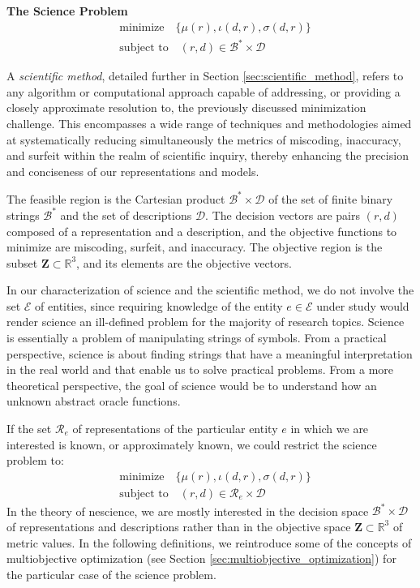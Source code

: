 \begin{tBox}
\textbf{The Science Problem}
\begin{align*}
 & \text{minimize} \quad \{ \mu(r), \iota(d, r), \sigma(d, r)\} \\
 & \text{subject to} \quad (r, d) \in \mathcal{B}^\ast \times \mathcal{D}
\end{align*}
\end{tBox}

A \emph{scientific method}, detailed further in Section \ref{sec:scientific_method}, refers to any algorithm or computational approach capable of addressing, or providing a closely approximate resolution to, the previously discussed minimization challenge. This encompasses a wide range of techniques and methodologies aimed at systematically reducing simultaneously the metrics of miscoding, inaccuracy, and surfeit within the realm of scientific inquiry, thereby enhancing the precision and conciseness of our representations and models.

The feasible region is the Cartesian product $\mathcal{B}^\ast \times \mathcal{D}$ of the set of finite binary strings $\mathcal{B}^\ast$ and the set of descriptions $\mathcal{D}$. The decision vectors are pairs $(r, d)$ composed of a representation and a description, and the objective functions to minimize are miscoding, surfeit, and inaccuracy. The objective region is the subset $\mathbf{Z} \subset \mathbb{R}^3$, and its elements are the objective vectors.

In our characterization of science and the scientific method, we do not involve the set $\mathcal{E}$ of entities, since requiring knowledge of the entity $e \in \mathcal{E}$ under study would render science an ill-defined problem for the majority of research topics. Science is essentially a problem of manipulating strings of symbols. From a practical perspective, science is about finding strings that have a meaningful interpretation in the real world and that enable us to solve practical problems. From a more theoretical perspective, the goal of science would be to understand how an unknown abstract oracle functions.

If the set $\mathcal{R}_e$ of representations of the particular entity $e$ in which we are interested is known, or approximately known, we could restrict the science problem to:
\begin{align*}
 & \text{minimize} \quad \{ \mu(r), \iota(d, r), \sigma(d, r)\} \\
 & \text{subject to} \quad (r, d) \in \mathcal{R}_e \times \mathcal{D}
\end{align*}
In the theory of nescience, we are mostly interested in the decision space $\mathcal{B}^\ast \times \mathcal{D}$ of representations and descriptions rather than in the objective space $\mathbf{Z} \subset \mathbb{R}^3$ of metric values. In the following definitions, we reintroduce some of the concepts of multiobjective optimization (see Section \ref{sec:multiobjective_optimization}) for the particular case of the science problem.

